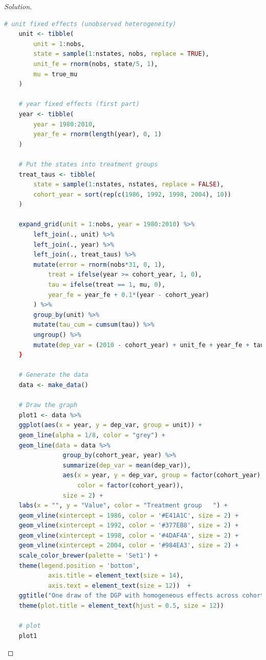 \documentclass[11pt]{article}
\newenvironment{solution}{%
  \renewcommand\qedsymbol{$\blacksquare$}%
  \begin{mdframed}[backgroundcolor=gray!15]%
  \begin{proof}[Solution]}%
  {\end{proof}%
  \end{mdframed}}%
\begin{document}
\begin{enumerate}
\begin{solution}
\begin{lstlisting}[language=R]
    # unit fixed effects (unobserved heterogeneity)
    unit <- tibble(
        unit = 1:nobs,
        state = sample(1:nstates, nobs, replace = TRUE),
        unit_fe = rnorm(nobs, state/5, 1),
        mu = true_mu
    )
    
    # year fixed effects (first part)
    year <- tibble(
        year = 1980:2010,
        year_fe = rnorm(length(year), 0, 1)
    )
    
    # Put the states into treatment groups
    treat_taus <- tibble(
        state = sample(1:nstates, nstates, replace = FALSE),
        cohort_year = sort(rep(c(1986, 1992, 1998, 2004), 10))
    )
    
    expand_grid(unit = 1:nobs, year = 1980:2010) %>% 
        left_join(., unit) %>% 
        left_join(., year) %>% 
        left_join(., treat_taus) %>% 
        mutate(error = rnorm(nobs*31, 0, 1),
            treat = ifelse(year >= cohort_year, 1, 0),
            tau = ifelse(treat == 1, mu, 0),
            year_fe = year_fe + 0.1*(year - cohort_year)
        ) %>% 
        group_by(unit) %>% 
        mutate(tau_cum = cumsum(tau)) %>% 
        ungroup() %>% 
        mutate(dep_var = (2010 - cohort_year) + unit_fe + year_fe + tau_cum + error)
    }

    # Generate the data
    data <- make_data()

    # Draw the graph
    plot1 <- data %>% 
    ggplot(aes(x = year, y = dep_var, group = unit)) + 
    geom_line(alpha = 1/8, color = "grey") + 
    geom_line(data = data %>% 
                group_by(cohort_year, year) %>% 
                summarize(dep_var = mean(dep_var)),
                aes(x = year, y = dep_var, group = factor(cohort_year),
                    color = factor(cohort_year)),
                size = 2) + 
    labs(x = "", y = "Value", color = "Treatment group   ") + 
    geom_vline(xintercept = 1986, color = '#E41A1C', size = 2) + 
    geom_vline(xintercept = 1992, color = '#377EB8', size = 2) + 
    geom_vline(xintercept = 1998, color = '#4DAF4A', size = 2) + 
    geom_vline(xintercept = 2004, color = '#984EA3', size = 2) + 
    scale_color_brewer(palette = 'Set1') + 
    theme(legend.position = 'bottom',
            axis.title = element_text(size = 14),
            axis.text = element_text(size = 12))  +
    ggtitle("One draw of the DGP with homogeneous effects across cohorts \n and with all groups being eventually treated") +
    theme(plot.title = element_text(hjust = 0.5, size = 12))

    # plot
    plot1
                \end{lstlisting}


\end{solution}
\end{enumerate}
\end{document}
